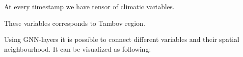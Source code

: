 \documentclass{article}
\begin{document}
At every timestamp we have tensor of climatic variables.   
\begin{figure}[h]
\begin{minipage}[h]{0.49\linewidth}
\end{minipage}
\hfill
\begin{minipage}[h]{0.49\linewidth}
\end{minipage}
\end{figure}

These variables corresponds to Tambov region.

Using GNN-layers it is possible to connect different variables and their spatial neighbourhood. It can be visualized as following: 
\end{document}

